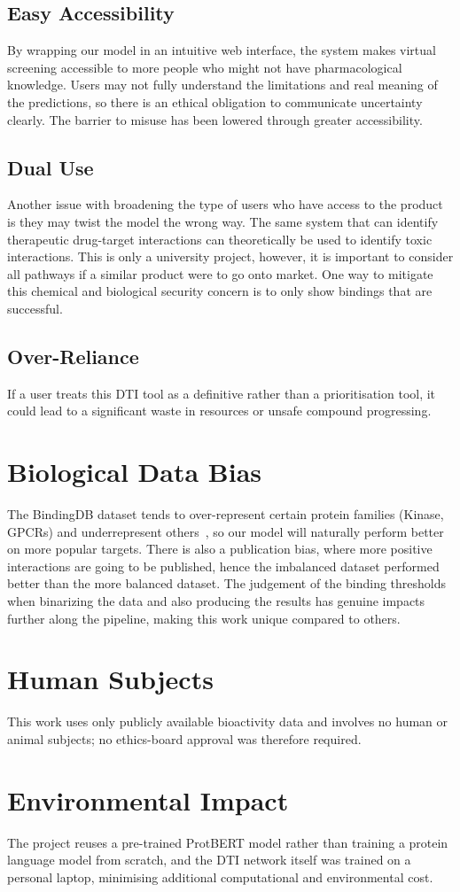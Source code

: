 \subsection{Easy Accessibility}
\label{subsec:easy-accessibility}
By wrapping our model in an intuitive web interface, the system makes virtual screening accessible to more people who might not have pharmacological knowledge.
Users may not fully understand the limitations and real meaning of the predictions, so there is an ethical obligation to communicate uncertainty clearly.
The barrier to misuse has been lowered through greater accessibility.
\subsection{Dual Use}
Another issue with broadening the type of users who have access to the product is they may twist the model the wrong way.
The same system that can identify therapeutic drug-target interactions can theoretically be used to identify toxic interactions.
This is only a university project, however, it is important to consider all pathways if a similar product were to go onto market.
One way to mitigate this chemical and biological security concern is to only show bindings that are successful.
\subsection{Over-Reliance}
If a user treats this DTI tool as a definitive rather than a prioritisation tool, it could lead to a significant waste in resources or unsafe compound progressing.
\section{Biological Data Bias}
The BindingDB dataset tends to over-represent certain protein families (Kinase, GPCRs) and underrepresent others~\citep{Liu2025}, so our model will naturally perform better on more popular targets.
There is also a publication bias, where more positive interactions are going to be published, hence the imbalanced dataset performed better than the more balanced dataset.
The judgement of the binding thresholds when binarizing the data and also producing the results has genuine impacts further along the pipeline, making this work unique compared to others.

\section{Human Subjects}
This work uses only publicly available bioactivity data and involves no human or animal subjects; no ethics-board approval was therefore required.

\section{Environmental Impact}
The project reuses a pre-trained ProtBERT model rather than training a protein language model from scratch, and the DTI network itself was trained on a personal laptop, minimising additional computational and environmental cost.
